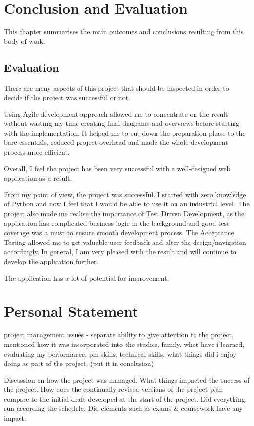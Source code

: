 \chapter{Conclusion and Evaluation}
\label{ch:ConclusionEvaluation}
This chapter summarises the main outcomes and conclusions resulting from this body of work.

\section{Evaluation}
There are meny aspects of this project that should be inspected in order to decide if the project was successful or not.

Using Agile development approach allowed me to concentrate on the result without wasting my time creating final diagrams and overviews before starting with the implementation. It helped me to cut down the preparation phase to the bare essentials, reduced project overhead and made the whole development process more efficient.

Overall, I feel the project has been very successful with a well-designed web application as a result.


From my point of view, the project was successful. I started with zero knowledge of Python and now I feel that I would be able to use it on an industrial level. The project also made me realise the importance of Test Driven Development, as the application has complicated business logic in the background and good test coverage was a must to ensure smooth development process. The Acceptance Testing allowed me to get valuable user feedback and alter the design/navigation accordingly. In general, I am very pleased with the result and will continue to develop the application further.

The application has a lot of potential for improvement.


\chapter{Personal Statement}
\label{ch:personalstatement_appendix}
project management issues - separate ability to give attention to the project, mentioned how it was incorporated into the studies, family. what have i learned, evaluating my performance, pm skills, technical skills, what things did i enjoy doing as part of the project. (put it in conclusion)

Discussion on how the project was managed. What things impacted the success of the project. How does the continually revised versions of the project plan compare to the initial draft developed at the start of the project. Did everything run according the schedule. Did elements such as exams \& coursework have any impact. 


